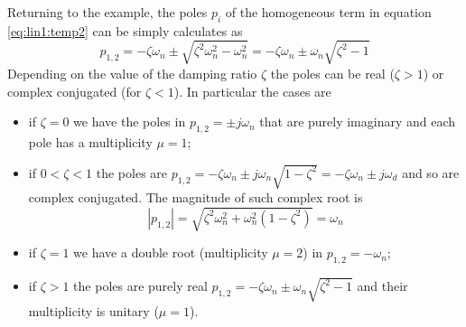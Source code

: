 		Returning to the example, the poles $p_i$ of the homogeneous term in equation \ref{eq:lin1:temp2} can be simply calculates as
		\[ p_{1,2} = - \zeta \omega_n \pm \sqrt{\zeta^2\omega_n^2 - \omega_n^2} = -\zeta \omega_n \pm \omega_n \sqrt{\zeta^2 - 1} \]
		Depending on the value of the damping ratio $\zeta$ the poles can be real ($\zeta > 1$) or complex conjugated (for $\zeta < 1$). In particular the cases are
		\begin{itemize}
			\item if $\zeta = 0$ we have the poles in $p_{1,2} = \pm j\omega_n$ that are purely imaginary and each pole has a multiplicity $\mu = 1$;
			\item if $0 < \zeta< 1$ the poles are $p_{1,2} = - \zeta \omega_n \pm j\omega_n \sqrt{1-\zeta^2}= -\zeta \omega_n \pm j\omega_d$ and so are complex conjugated. The magnitude of such complex root is
			\[ |p_{1,2}| = \sqrt{\zeta^2 \omega_n^2 + \omega_n^2(1-\zeta^2)} = \omega_n \]
			\item if $\zeta = 1$ we have a double root (multiplicity $\mu = 2$) in $p_{1,2} = - \omega_n$;
			\item if $\zeta> 1$ the poles are purely real $p_{1,2} = -\zeta \omega_n \pm \omega_n \sqrt{\zeta^2-1}$ and their multiplicity is unitary ($\mu = 1$).
		\end{itemize}
		
